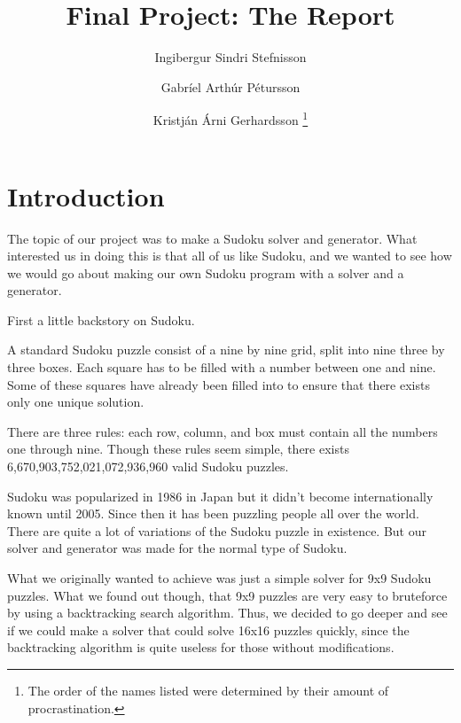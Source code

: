 \documentclass[12pt,a4paper]{article}
\title{Final Project: The Report}
\author{Ingibergur Sindri Stefnisson \and Gabríel Arthúr Pétursson \and Kristján Árni Gerhardsson
	\footnote{The order of the names listed were determined by their amount of procrastination.}}
\begin{document}
\maketitle

\clearpage


\section*{Introduction}

The topic of our project was to make a Sudoku solver and generator. What interested
us in doing this is that all of us like Sudoku, and we wanted to see how we would
go about making our own Sudoku program with a solver and a generator.

First a little backstory on Sudoku.

A standard Sudoku puzzle consist of a nine by nine grid, split into nine three
by three boxes. Each square has to be filled with a number between one and nine.
Some of these squares have already been filled into to ensure that there exists
only one unique solution.

There are three rules: each row, column, and box must contain all the numbers
one through nine. Though these rules seem simple, there exists
6,670,903,752,021,072,936,960 valid Sudoku puzzles.

Sudoku was popularized in 1986 in Japan but it didn't become internationally known
until 2005. Since then it has been puzzling people all over the world.
There are quite a lot of variations of the Sudoku puzzle in existence. But our 
solver and generator was made for the normal type of Sudoku.

What we originally wanted to achieve was just a simple solver for 9x9 Sudoku puzzles.
What we found out though, that 9x9 puzzles are very easy to bruteforce by using
a backtracking search algorithm. Thus, we decided to go deeper and see if we could
make a solver that could solve 16x16 puzzles quickly, since the backtracking algorithm
is quite useless for those without modifications.
\end{document}
